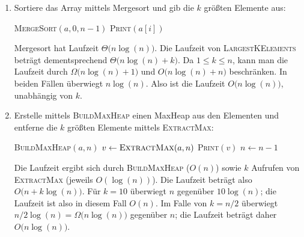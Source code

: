 \documentclass[11pt,a4paper]{article}
\begin{document}
\begin{loesung}
    \begin{enumerate}
        \item Sortiere das Array mittels Mergesort und gib die $k$ größten Elemente aus:
        \begin{algorithmic}[1]
                \State \textsc{MergeSort}$(a, 0, n - 1)$
                    \State \textsc{Print}$(a[i])$
                \EndFor
            \EndProcedure
        \end{algorithmic}
        Mergesort hat Laufzeit $\Theta\big(n \log(n)\big)$.
        Die Laufzeit von \textsc{LargestKElements} beträgt dementsprechend $\Theta\big(n \log(n) + k\big)$.
        Da $1 \leq k \leq n$, kann man die Laufzeit durch $\Omega\big(n \log(n) + 1\big)$ und $O\big(n \log(n) + n\big)$ beschränken.
        In beiden Fällen überwiegt $n \log(n)$.
        Also ist die Laufzeit $O\big(n \log(n)\big)$, unabhängig von $k$.

        \item Erstelle mittels \textsc{BuildMaxHeap} einen MaxHeap aus den Elementen und entferne die $k$ größten Elemente mittels \textsc{ExtractMax}:
        \begin{algorithmic}[1]
                \State \textsc{BuildMaxHeap}$(a, n)$
                    \State $v \gets \text{\textsc{ExtractMax}$(a, n)$}$
                    \State \textsc{Print}$(v)$
                    \State $n \gets n - 1$
                \EndFor
            \EndProcedure
        \end{algorithmic}
        Die Laufzeit ergibt sich durch \textsc{BuildMaxHeap} ($O(n)$) sowie $k$ Aufrufen von \textsc{ExtractMax} (jeweils $O(\log(n))$).
        Die Laufzeit beträgt also $O\big(n + k\log(n))$.
        Für $k = 10$ überwiegt $n$ gegenüber $10 \log(n)$; die Laufzeit ist also in diesem Fall $O(n)$. 
        Im Falle von $k = n / 2$ überwiegt $n / 2 \log(n) = \Omega\big(n \log(n)\big)$ gegenüber $n$; die Laufzeit beträgt daher $O\big(n \log(n)\big)$.


\end{enumerate}
\end{loesung}
\end{document}
